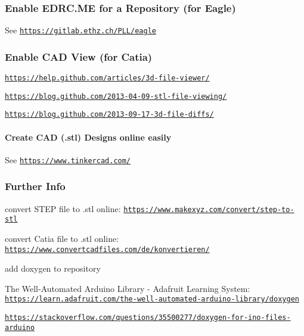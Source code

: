 \subsubsection*{Enable E\-D\-R\-C.\-M\-E for a Repository (for Eagle)}

See \href{https://gitlab.ethz.ch/PLL/eagle}{\tt https\-://gitlab.\-ethz.\-ch/\-P\-L\-L/eagle}

\subsubsection*{Enable C\-A\-D View (for Catia)}


\begin{DoxyItemize}
\item \href{https://help.github.com/articles/3d-file-viewer/}{\tt https\-://help.\-github.\-com/articles/3d-\/file-\/viewer/}
\item \href{https://blog.github.com/2013-04-09-stl-file-viewing/}{\tt https\-://blog.\-github.\-com/2013-\/04-\/09-\/stl-\/file-\/viewing/}
\item \href{https://blog.github.com/2013-09-17-3d-file-diffs/}{\tt https\-://blog.\-github.\-com/2013-\/09-\/17-\/3d-\/file-\/diffs/}
\end{DoxyItemize}

\paragraph*{Create C\-A\-D (.stl) Designs online easily}

See \href{https://www.tinkercad.com/}{\tt https\-://www.\-tinkercad.\-com/}

\subsubsection*{Further Info}


\begin{DoxyItemize}
\item convert S\-T\-E\-P file to .stl online\-: \href{https://www.makexyz.com/convert/step-to-stl}{\tt https\-://www.\-makexyz.\-com/convert/step-\/to-\/stl}
\item convert Catia file to .stl online\-: \href{https://www.convertcadfiles.com/de/konvertieren/}{\tt https\-://www.\-convertcadfiles.\-com/de/konvertieren/}
\item add doxygen to repository
\begin{DoxyItemize}
\item The Well-\/\-Automated Arduino Library -\/ Adafruit Learning System\-: \href{https://learn.adafruit.com/the-well-automated-arduino-library/doxygen}{\tt https\-://learn.\-adafruit.\-com/the-\/well-\/automated-\/arduino-\/library/doxygen}
\item \href{https://stackoverflow.com/questions/35500277/doxygen-for-ino-files-arduino}{\tt https\-://stackoverflow.\-com/questions/35500277/doxygen-\/for-\/ino-\/files-\/arduino} 
\end{DoxyItemize}
\end{DoxyItemize}